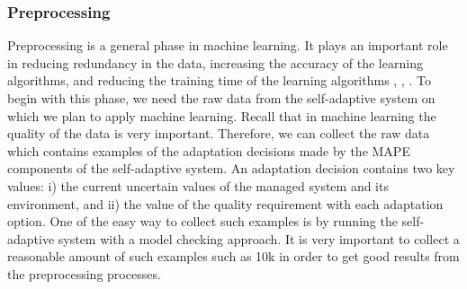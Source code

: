 \documentclass[a4paper,12pt]{article}
\begin{document}
\subsubsection{Preprocessing} 
Preprocessing is a general phase in machine learning. It plays an important role in reducing redundancy in the data, increasing the accuracy of the learning algorithms, and reducing the training time of the learning algorithms \cite{HOMLWSLATF-2017}, \cite{SLMLIP-2011}, \cite{LSLMLIP-2013}. To begin with this phase, we need the raw data from the self-adaptive system on which we plan to apply machine learning. Recall that in machine learning the quality of the data is very important. Therefore, we can collect the raw data which contains examples of the adaptation decisions made by the MAPE components of the self-adaptive system. An adaptation decision contains two key values: i) the current uncertain values of the managed system and its environment, and ii) the value of the quality requirement with each adaptation option. One of the easy way to collect such examples is by running the self-adaptive system with a model checking approach. It is very important to collect a reasonable amount of such examples such as 10k in order to get good results from the preprocessing processes.
\end{document}
